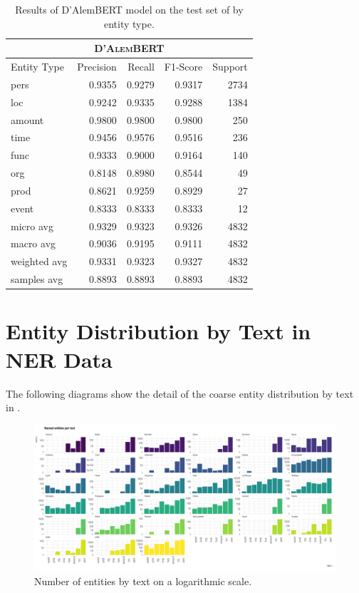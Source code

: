 \begin{table}[ht!]
    \centering\small
    \begin{tabular}{lrrrr}
        \toprule
        \multicolumn{5}{c}{\textsc{D'AlemBERT}}                \\
        \midrule
        Entity Type  & Precision & Recall & F1-Score & Support \\
        \midrule
        pers         & 0.9355    & 0.9279 & 0.9317   & 2734    \\
        loc          & 0.9242    & 0.9335 & 0.9288   & 1384    \\
        amount       & 0.9800    & 0.9800 & 0.9800   & 250     \\
        time         & 0.9456    & 0.9576 & 0.9516   & 236     \\
        func         & 0.9333    & 0.9000 & 0.9164   & 140     \\
        org          & 0.8148    & 0.8980 & 0.8544   & 49      \\
        prod         & 0.8621    & 0.9259 & 0.8929   & 27      \\
        event        & 0.8333    & 0.8333 & 0.8333   & 12      \\
        \midrule
        micro avg    & 0.9329    & 0.9323 & 0.9326   & 4832    \\
        macro avg    & 0.9036    & 0.9195 & 0.9111   & 4832    \\
        weighted avg & 0.9331    & 0.9323 & 0.9327   & 4832    \\
        samples avg  & 0.8893    & 0.8893 & 0.8893   & 4832    \\
        \bottomrule
    \end{tabular}
    \caption{Results of D'AlemBERT model on the test set of \freemner by entity type.}
\end{table}

\section{Entity Distribution by Text in NER Data}

The following diagrams show the detail of the coarse entity distribution by text in \freemner.

\begin{figure}
    \centering
    \includegraphics[width=\textwidth]{static/media/mod_eval/dalembert/freem_ner_entities_by_text.png}
    \caption{Number of entities by text on a logarithmic scale.}
    \label{fig:entities-by-text}
\end{figure}

